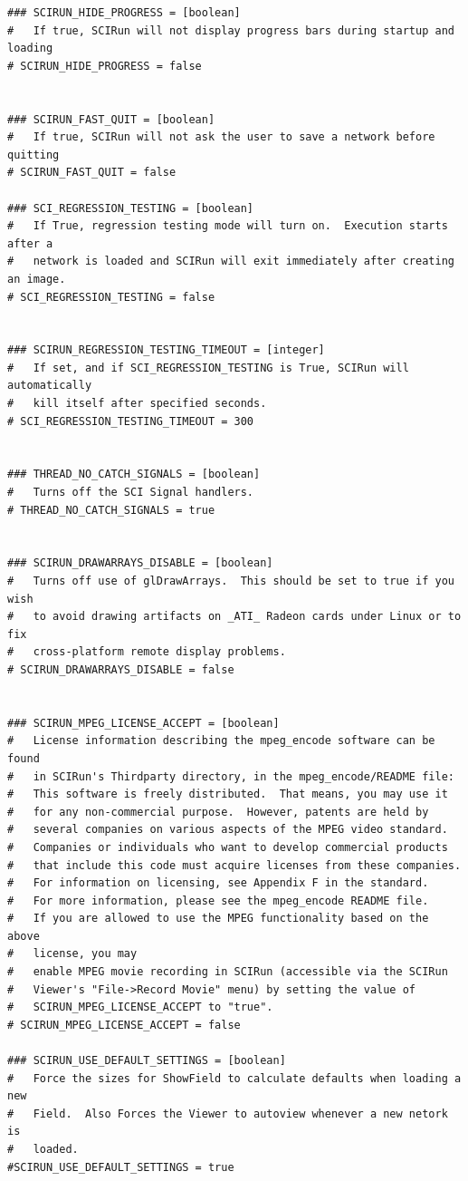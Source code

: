\documentclass[fleqn,12pt,openany]{book}
\begin{document}
\begin{verbatim}
### SCIRUN_HIDE_PROGRESS = [boolean]
#   If true, SCIRun will not display progress bars during startup and loading
# SCIRUN_HIDE_PROGRESS = false


### SCIRUN_FAST_QUIT = [boolean]
#   If true, SCIRun will not ask the user to save a network before quitting
# SCIRUN_FAST_QUIT = false

### SCI_REGRESSION_TESTING = [boolean]
#   If True, regression testing mode will turn on.  Execution starts after a
#   network is loaded and SCIRun will exit immediately after creating an image.
# SCI_REGRESSION_TESTING = false


### SCIRUN_REGRESSION_TESTING_TIMEOUT = [integer]
#   If set, and if SCI_REGRESSION_TESTING is True, SCIRun will automatically
#   kill itself after specified seconds.
# SCI_REGRESSION_TESTING_TIMEOUT = 300


### THREAD_NO_CATCH_SIGNALS = [boolean]
#   Turns off the SCI Signal handlers.
# THREAD_NO_CATCH_SIGNALS = true


### SCIRUN_DRAWARRAYS_DISABLE = [boolean]
#   Turns off use of glDrawArrays.  This should be set to true if you wish
#   to avoid drawing artifacts on _ATI_ Radeon cards under Linux or to fix
#   cross-platform remote display problems.
# SCIRUN_DRAWARRAYS_DISABLE = false


### SCIRUN_MPEG_LICENSE_ACCEPT = [boolean]
#   License information describing the mpeg_encode software can be found
#   in SCIRun's Thirdparty directory, in the mpeg_encode/README file:
#   This software is freely distributed.  That means, you may use it
#   for any non-commercial purpose.  However, patents are held by
#   several companies on various aspects of the MPEG video standard.  
#   Companies or individuals who want to develop commercial products 
#   that include this code must acquire licenses from these companies.  
#   For information on licensing, see Appendix F in the standard.
#   For more information, please see the mpeg_encode README file.
#   If you are allowed to use the MPEG functionality based on the above
#   license, you may
#   enable MPEG movie recording in SCIRun (accessible via the SCIRun
#   Viewer's "File->Record Movie" menu) by setting the value of
#   SCIRUN_MPEG_LICENSE_ACCEPT to "true".
# SCIRUN_MPEG_LICENSE_ACCEPT = false

### SCIRUN_USE_DEFAULT_SETTINGS = [boolean]
#   Force the sizes for ShowField to calculate defaults when loading a new 
#   Field.  Also Forces the Viewer to autoview whenever a new netork is
#   loaded.
#SCIRUN_USE_DEFAULT_SETTINGS = true


\end{verbatim}
\end{document}
